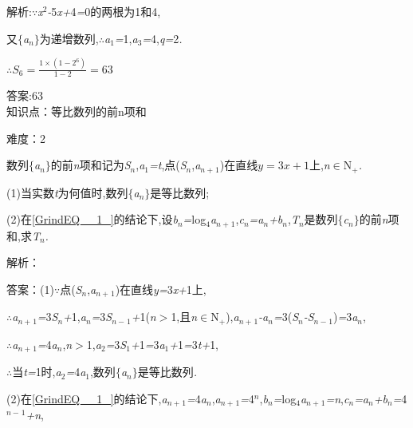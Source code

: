 \documentclass{article} %
\begin{document}
 解析:\textit{$\because$x}${}^{2}$\textit{-}5\textit{x+}4\textit{=}0的两根为1和4,

又$\mathrm{\{}$\textit{a${}_{n}$}$\mathrm{\}}$为递增数列,\textit{$\therefore$a}${}_{1}$\textit{=}1,\textit{a}${}_{3}$\textit{=}4,\textit{q=}2\textit{.}

$\therefore S_6=\frac{1\times (1-2^6)}{1-2}=63$
 
 答案:63 \\

知识点：等比数列的前n项和

难度：2

 数列$\mathrm{\{}$\textit{a${}_{n}$}$\mathrm{\}}$的前\textit{n}项和记为\textit{S${}_{n}$},\textit{a}${}_{1}$\textit{=t},点(\textit{S${}_{n}$},\textit{a${}_{n+}$}${}_{1}$)在直线$y=3x+1$上,\textit{n}$\mathrm{\in}$N\textit{${}_{+}$.}

 (1)当实数\textit{t}为何值时,数列$\mathrm{\{}$\textit{a${}_{n}$}$\mathrm{\}}$是等比数列;

 (2)在\eqref{GrindEQ__1_}的结论下,设\textit{b${}_{n}$=}log${}_{4}$\textit{a${}_{n+}$}${}_{1}$,\textit{c${}_{n}$=a${}_{n}$+b${}_{n}$},\textit{T${}_{n}$}是数列$\mathrm{\{}$\textit{c${}_{n}$}$\mathrm{\}}$的前\textit{n}项和,求\textit{T${}_{n}$.}

解析：

 答案：(1)\textit{$\because$}点(\textit{S${}_{n}$},\textit{a${}_{n+}$}${}_{1}$)在直线\textit{y=}3\textit{x+}1上,

\textit{$\therefore$a${}_{n+}$}${}_{1}$\textit{=}3\textit{S${}_{n}$+}1,\textit{a${}_{n}$=}3\textit{S${}_{n-}$}${}_{1}$\textit{+}1(\textit{n$>$}1,且\textit{n}$\mathrm{\in}$N\textit{${}_{+}$}),\textit{a${}_{n+}$}${}_{1}$\textit{-a${}_{n}$=}3(\textit{S${}_{n}$-S${}_{n-}$}${}_{1}$)\textit{=}3\textit{a${}_{n}$},

\textit{$\therefore$a${}_{n+}$}${}_{1}$\textit{=}4\textit{a${}_{n}$},\textit{n$>$}1,\textit{a}${}_{2}$\textit{=}3\textit{S}${}_{1}$\textit{+}1\textit{=}3\textit{a}${}_{1}$\textit{+}1\textit{=}3\textit{t+}1,

\textit{$\therefore$}当\textit{t=}1时,\textit{a}${}_{2}$\textit{=}4\textit{a}${}_{1}$,数列$\mathrm{\{}$\textit{a${}_{n}$}$\mathrm{\}}$是等比数列\textit{.}

(2)在\eqref{GrindEQ__1_}的结论下,\textit{a${}_{n+}$}${}_{1}$\textit{=}4\textit{a${}_{n}$},\textit{a${}_{n+}$}${}_{1}$\textit{=}4\textit{${}^{n}$},\textit{b${}_{n}$=}log${}_{4}$\textit{a${}_{n+}$}${}_{1}$\textit{=n},\textit{c${}_{n}$=a${}_{n}$+b${}_{n}$=}4\textit{${}^{n-}$}${}^{1}$\textit{+n},
\end{document}
